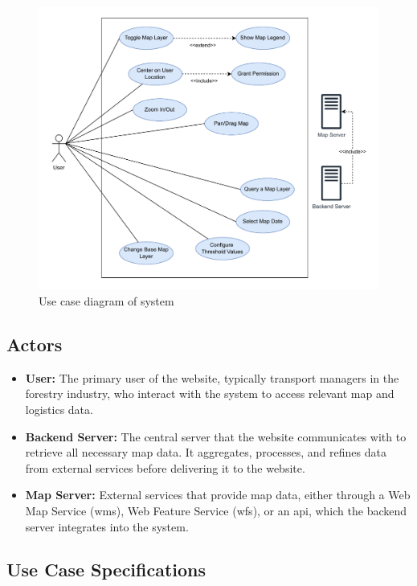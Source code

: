 \begin{figure}[h]
    \centering
    \includegraphics[width=1\linewidth]{figures/skogkurs_use_case.pdf}
    \caption{Use case diagram of system}
    \label{fig:use_case_diagram}
\end{figure}

\subsection{Actors}

\begin{itemize}
    \item \textbf{User:} The primary user of the website, typically transport managers in the forestry industry, who interact with the system to access relevant map and logistics data.
    \item \textbf{Backend Server:} The central server that the website communicates with to retrieve all necessary map data. It aggregates, processes, and refines data from external services before delivering it to the website.
    \item \textbf{Map Server:} External services that provide map data, either through a Web Map Service (\Gls{wms}), Web Feature Service (\Gls{wfs}), or an \acrshort{api}, which the backend server integrates into the system.
\end{itemize}

\subsection{Use Case Specifications}

